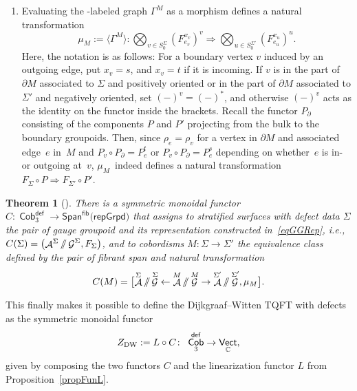 \documentclass[pdftex]{sigma}
\DeclareMathOperator{\vect}{\mathsf{Vect}}
\DeclareMathOperator{\C}{\mathbb{C}}
\DeclareMathOperator{\Cob}{\mathsf{Cob}}
\DeclareMathOperator{\cala}{\mathcal{A}}
\DeclareMathOperator{\calg}{\mathcal{G}}
\newcommand{\sslash}{\mathbin{/\mkern-6mu/}}
\numberwithin{equation}{section}
\newtheorem{Theorem}{Theorem}[section]
\theoremstyle{definition}
\begin{document}
\begin{enumerate}
 Altogether, the result is a graph $\Gamma^M$ labeled in the monoidal category \smash{$\vect_{\C}^{\cala^M \sslash \calg^M}$}. The graph has a well-defined evaluation to a morphism in \smash{$\vect_{\C}^{\cala^M \sslash \calg^M}$} because the category is spherical and symmetric.
 \item Evaluating the \smash{$\vect_{\C}^{\cala^M \sslash \calg^M}$}-labeled graph $\Gamma^M$ as a morphism defines a natural transformation
 \[
 \mu_M := \bigl\langle \Gamma^M\bigr\rangle\colon \bigotimes_{v \in S_0^{\Sigma}} (F_{e_v}^{x_v})^v \Rightarrow \bigotimes_{u \in S_0^{\Sigma'}} (F_{e_u}^{x_u})^u.
\]
Here, the notation is as follows: For a boundary vertex $v$ induced by an outgoing edge, put $x_v = s$, and $x_v = t$ if it is incoming. If $v$ is in the part of $\partial M$ associated to $\Sigma$ and positively oriented or in the part of $\partial M$ associated to $\Sigma'$ and negatively oriented, set $(-)^v = (-)^*$, and otherwise $(-)^v$ acts as the identity on the functor inside the brackets. Recall the functor $P_{\partial}$ consisting of the components $P$ and $P'$ projecting from the bulk to the boundary groupoids. Then, since $\rho_e = \rho_v$ for a vertex in $\partial M$ and associated edge~$e$ in~$M$ and $P_v \circ P_{\partial} = P_e^t$ or $P_v \circ P_{\partial} = P_e^s$ depending on whether~$e$ is in- or outgoing at~$v$, $\mu_M$~indeed defines a natural transformation $F_{\Sigma} \circ P \Rightarrow F_{\Sigma'} \circ P'$.
\end{enumerate}
\begin{Theorem}[{\cite[Proposition 6.7]{FMM}}]
 There is a symmetric monoidal functor $C\colon \Cob_3^{\mathsf{def}} \rightarrow \mathsf{Span}^{\mathsf{fib}}(\mathsf{repGrpd)} $ that assigns to stratified surfaces with defect data $\Sigma$ the pair of gauge groupoid and its representation constructed in~\eqref{eqGGRep}, i.e., $C(\Sigma) = \bigl(\cala^{\Sigma} \sslash \calg^{\Sigma}, F_{\Sigma}\bigr)$, and to cobordisms $M\colon \Sigma \rightarrow \Sigma'$ the equivalence class defined by the pair of fibrant span and natural transformation
 \begin{align*}
 C(M) = \bigl[\cala^{\Sigma} \sslash \calg^{\Sigma} \leftarrow \cala^M \sslash \calg^M \rightarrow \cala^{\Sigma'} \sslash \calg^{\Sigma'}, \mu_M\bigr].
 \end{align*}
\end{Theorem}
This finally makes it possible to define the Dijkgraaf--Witten TQFT with defects as the symmetric monoidal functor \cite[Theorem 6.8]{FMM}
\begin{align}
 Z_{\rm DW} := L \circ C\colon \ \Cob_3^{\mathsf{def}} \rightarrow \vect_{\C},
\end{align}
given by composing the two functors $C$ and the linearization functor $L$ from Proposition~\ref{propFunL}.
\end{document}
